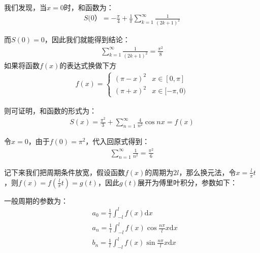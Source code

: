\documentclass{ctexart}
\begin{document}
\begin{tcolorbox}[
    colback=bac1,     %
    colframe=fra1,   %
    coltitle=white!80,    
    coltext=tex1,%
    title=做一些延伸,
    fonttitle=\bfseries,        %
arc=2mm,                     %
breakable
]
我们发现，当$x=0$时，和函数为：
\begin{align*}
    S(0）=-\frac{\pi}{4}+\frac{1}{\pi}\sum_{k=1}^\infty\frac{1}{(2k+1)^2}
\end{align*}

而$S(0)=0$，因此我们就能得到结论：
\begin{align*}
    \sum_{k=1}^\infty \frac{1}{(2k+1)^2}=\frac{\pi^2}{8}
\end{align*}
如果将函数$f(x)$的表达式换做下方
\begin{align*}
    f(x)=\begin{cases}
        (\pi-x)^2 & x\in[0,\pi]\\
        (\pi+x)^2&  x\in[-\pi,0)
    \end{cases}
\end{align*}

则可证明，和函数的形式为：
\begin{align*}
    S(x)=\frac{\pi^2}{3}+\sum_{n=1}^\infty\frac{4}{n^2}\cos nx=f(x)
 \end{align*}

 令$x=0$，由于$f(0)=\pi^2$，代入回原式得到：
 \begin{align*}
     \sum_{n=1}^\infty\frac{1}{n^2}=\frac{\pi^2}{6}
\end{align*}
\end{tcolorbox}

记下来我们把周期条件放宽，假设函数$f(x)$的周期为$2l$，那么换元法，令$x=\frac{l}{\pi}t$，则$f(x)=f(\frac{l}{\pi}t)=g(t)$，因此$g(t)$展开为傅里叶积分，参数如下：
\begin{tcolorbox}[
    colback=bac2,     %
    colframe=fra2,   %
    coltitle=white,             %
    coltext=tex2,
    title=一般周期下的傅里叶积分参数,
    fonttitle=\bfseries,        %
arc=3mm,                     %
breakable
]
一般周期的参数为：
\begin{align*}
    &a_0=\frac{1}{l}\int_{-l}^l f(x)\mathrm{d}x\\
    &a_n=\frac{1}{l}\int_{-l}^l f(x)\cos \frac{n\pi}{l}x\mathrm{d}x\\
    &b_n=\frac{1}{l}\int_{-l}^l f(x)\sin \frac{n\pi}{l}x\mathrm{d}x
\end{align*}
\end{tcolorbox}
\end{document}
